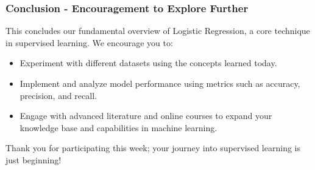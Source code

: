\documentclass[aspectratio=169]{beamer}
\begin{document}
\begin{frame}[fragile]
    \frametitle{Conclusion - Encouragement to Explore Further}
    This concludes our fundamental overview of Logistic Regression, a core technique in supervised learning. We encourage you to:
    
    \begin{itemize}
        \item Experiment with different datasets using the concepts learned today.
        \item Implement and analyze model performance using metrics such as accuracy, precision, and recall.
        \item Engage with advanced literature and online courses to expand your knowledge base and capabilities in machine learning.
    \end{itemize}
    
    Thank you for participating this week; your journey into supervised learning is just beginning!
\end{frame}
\end{document}
